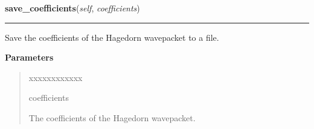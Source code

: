     \label{Serializer:Serializer:save_coefficients}

    \vspace{0.5ex}

\hspace{.8\funcindent}\begin{boxedminipage}{\funcwidth}

    \raggedright \textbf{save\_coefficients}(\textit{self}, \textit{coefficients})

    \vspace{-1.5ex}

    \rule{\textwidth}{0.5\fboxrule}
\setlength{\parskip}{2ex}
    Save the coefficients of the Hagedorn wavepacket to a file.

\setlength{\parskip}{1ex}
      \textbf{Parameters}
      \vspace{-1ex}

      \begin{quote}
        \begin{Ventry}{xxxxxxxxxxxx}

          \item[coefficients]

          The coefficients of the Hagedorn wavepacket.

        \end{Ventry}

      \end{quote}

    \end{boxedminipage}

    \label{Serializer:Serializer:save_parameters}

    \vspace{0.5ex}

